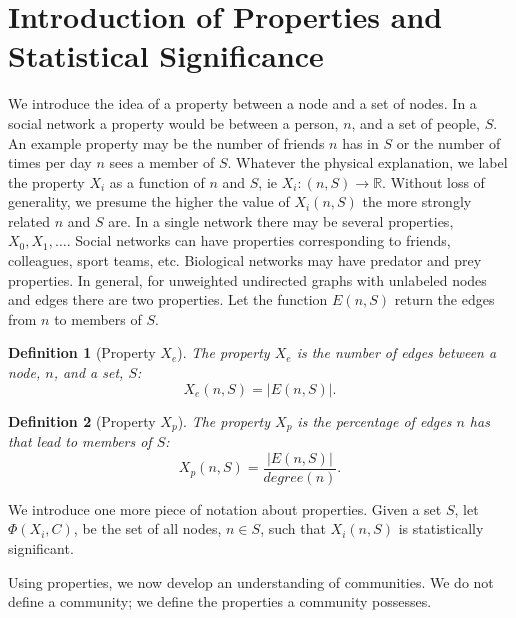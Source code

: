 \documentclass[phd,tocprelim]{cornell}
\newtheorem{definition}{Definition}
\begin{document}
\section {Introduction of Properties and Statistical Significance}


We introduce the idea of a property between a node and a set of nodes.  In a social network a property would be between a person, $n$, and a set of people, $S$.  An example property may be the number of friends $n$ has in $S$ or the number of times per day $n$ sees a member of $S$.  Whatever the physical explanation, we label the property $X_i$ as a function of $n$ and $S$, ie $X_i : (n, S) \rightarrow \mathbb{R}$.  Without loss of generality, we presume the higher the value of $X_i(n, S)$ the more strongly related $n$ and $S$ are.  In a single network there may be several properties, $X_0, X_1, \dots$.  Social networks can have properties corresponding to friends, colleagues, sport teams, etc.  Biological networks may have predator and prey properties.  In general, for unweighted undirected graphs with unlabeled nodes and edges there are two properties.  Let the function $E(n, S)$ return the edges from $n$ to members of $S$.

\begin{definition}[Property $X_e$]
The property $X_e$ is the number of edges between a node, $n$, and a set, $S$:
\begin{equation}
X_e(n, S) = |E(n, S)|.
\end{equation}
\end{definition}

\begin{definition}[Property $X_p$]
The property $X_p$ is the percentage of edges $n$ has that lead to members of $S$:
\begin{equation}
X_p(n, S) = \frac{|E(n, S)|}{degree(n)}.
\end{equation}
\end{definition}

We introduce one more piece of notation about properties.  Given a set $S$, let $\Phi (X_i, C)$, be the set of all nodes, $n \in S$, such that $X_i(n, S)$ is statistically significant.

Using properties, we now develop an understanding of communities.  We do not define a community; we define the properties a community possesses.
\end{document}
